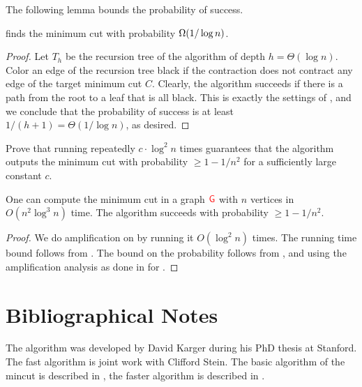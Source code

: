 The following lemma bounds the probability of success. 

\begin{lemma}
    \FastCut{} finds the minimum cut with probability $\Omega\pth[]{1/\log n}$.    
\end{lemma}
\begin{proof}
    Let $T_h$ be the recursion tree of the algorithm of depth $h =
    \Theta( \log n)$.  Color an edge of the recursion tree black if the
    contraction does not contract any edge of the target minimum cut $C$.%
    Clearly, the algorithm succeeds if there is
    a path from the root to a leaf that is all black. This is exactly
    the settings of , and we conclude that the
    probability of success is at least $1/(h+1) = \Theta(1/\log n)$,
    as desired.
\end{proof}

\begin{exercise}
    Prove that running \FastCut{} repeatedly $c\cdot\log^{2}n$ times
    guarantees that the algorithm outputs the minimum cut with
    probability $\geq1-1/n^{2}$ for a sufficiently large constant $c$.
\end{exercise} %

\begin{theorem}
    One can compute the minimum cut in a graph ${\textcolor{red}{\mathsf{G}}}$ with $n$
    vertices in $O(n^2 \log^3 n)$ time. The algorithm succeeds with
    probability $\geq 1-1/n^2$.
\end{theorem}
\begin{proof}
    We do amplification on \FastCut{} by running it $O(\log^2 n)$
    times. The running time bound follows from
    . The bound on the probability
    follows from , and using the
    amplification analysis as done in 
    for \MinCutRep{}.
\end{proof}






\section{Bibliographical Notes}

The \MinCut{} algorithm was developed by David Karger during his PhD
thesis at Stanford. The fast algorithm is joint work with Clifford
Stein.  The basic algorithm of the mincut is described in \cite[pages~7--9]{mr-ra-95}, the faster algorithm is described in \cite[pages~289--295]{mr-ra-95}.

